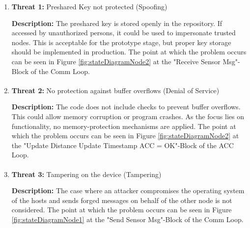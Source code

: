 \begin{enumerate}
		\item \textbf{Threat 1:} Preshared Key not protected (Spoofing)

            \textbf{Description:} The preshared key is stored openly in the repository. If accessed by unauthorized persons, it could be used to impersonate trusted nodes. This is acceptable for the prototype stage, but proper key storage should be implemented in production. The point at which the problem occurs can be seen in Figure \ref{fig:stateDiagramNode2} at the "Receive Sensor Msg"-Block of the Comm Loop.
            
        \paragraph{}
		\item \textbf{Threat 2:} No protection against buffer overflows (Denial of Service)
        
            \textbf{Description:} The code does not include checks to prevent buffer overflows. This could allow memory corruption or program crashes. As the focus lies on functionality, no memory-protection mechanisms are applied. The point at which the problem occurs can be seen in Figure \ref{fig:stateDiagramNode2} at the "Update Distance Update Timestamp ACC = OK"-Block of the ACC Loop.

        \paragraph{}
		\item \textbf{Threat 3:} Tampering on the device (Tampering)
        
            \textbf{Description:} The case where an attacker compromises the operating system of the hosts and sends forged messages on behalf of the other node is not considered. The point at which the problem occurs can be seen in Figure \ref{fig:stateDiagramNode1} at the "Send Sensor Msg"-Block of the Comm Loop.


	\end{enumerate}
